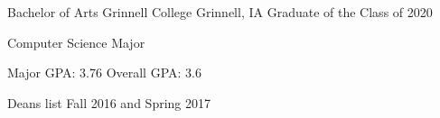 \documentclass[12pt, a4paper]{awesome-cv}
\begin{document}
\makecvheader


\begin{cventries}
  \cventry
    {Bachelor of Arts}
    {Grinnell College}
    {Grinnell, IA}
    {Graduate of the Class of 2020}
    {
      \begin{cvitems}
      	\item {Computer Science Major}
      	\item {Major GPA: 3.76 \quad Overall GPA: 3.6}
        \item {Deans list Fall 2016 and Spring 2017}
      \end{cvitems}
    }
\end{cventries}
\end{document}
